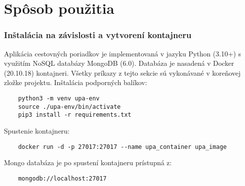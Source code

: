 \documentclass[10pt,xcolor=pdflatex,dvipsnames,table,oneside]{book}
\begin{document}




\chapter{Spôsob použitia}

\subsection*{Inštalácia na závislosti a vytvorení kontajneru}
\par Aplikácia cestovných poriadkov je implementovaná v jazyku Python (3.10+) s využitím NoSQL databázy MongoDB (6.0). Databáza je nasadená v Docker (20.10.18) kontajneri. Všetky príkazy z tejto sekcie sú vykonávané v koreňovej zložke projektu.
\newline \newline
Inštalácia podporných balíkov:
\begin{verbatim}
    python3 -m venv upa-env
    source ./upa-env/bin/activate
    pip3 install -r requirements.txt
\end{verbatim}
\newline \newline
Spustenie kontajneru:
\begin{verbatim}
    docker run -d -p 27017:27017 --name upa_container upa_image
\end{verbatim}
Mongo databáza je po spustení kontajneru prístupná z:
\begin{verbatim}
    mongodb://localhost:27017
\end{verbatim}
\end{document}
